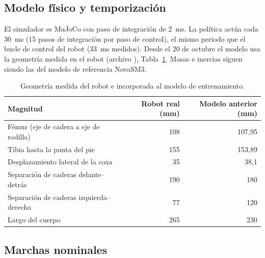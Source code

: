 \subsection{Modelo físico y temporización}

El simulador es MuJoCo con paso de integración de 2~ms. La política actúa cada
30~ms (15 pasos de integración por paso de control), el mismo periodo que el
bucle de control del robot (33~ms medidos). Desde el 20 de octubre el modelo usa
la geometría medida en el robot (archivo ),
Tabla~\ref{tab:geometria-real}. Masas e inercias siguen siendo las del modelo de
referencia NovaSM3.

\begin{table}[H]
\centering
\caption{Geometría medida del robot e incorporada al modelo de entrenamiento.}
\label{tab:geometria-real}
\small
\begin{tabular}{lrr}
\toprule
Magnitud & Robot real (mm) & Modelo anterior (mm) \\
\midrule
Fémur (eje de cadera a eje de rodilla) & 108 & 107,95 \\
Tibia hasta la punta del pie & 155 & 153,89 \\
Desplazamiento lateral de la coxa & 35 & 38,1 \\
Separación de caderas delante--detrás & 190 & 180 \\
Separación de caderas izquierda--derecha & 77 & 120 \\
Largo del cuerpo & 265 & 230 \\
\bottomrule
\end{tabular}
\end{table}

\subsection{Marchas nominales}

